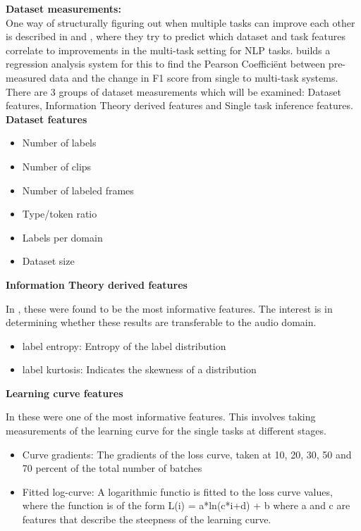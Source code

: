 	\textbf{Dataset measurements:}\\
	One way of structurally figuring out when multiple tasks can improve each other is described in \citet{alonso2016multitask} and \citet{bingel2017identifying}, where they try to predict which dataset and task features correlate to improvements in the multi-task setting for NLP tasks. \citet{bingel2017identifying} builds a regression analysis system for this to find the Pearson Coefficiënt between pre-measured data and the change in F1 score from single to multi-task systems. There are 3 groups of dataset measurements which will be examined: Dataset features, Information Theory derived features and Single task inference features. \\
	
	\textbf{Dataset features}
	\begin{itemize}
		\item Number of labels
		\item Number of clips
		\item Number of labeled frames
		\item Type/token ratio
		\item Labels per domain
		\item Dataset size
	\end{itemize}
	
	\textbf{Information Theory derived features}
	
	In \citet{alonso2016multitask}, these were found to be the most informative features. The interest is in determining whether these results are transferable to the audio domain.
	\begin{itemize}
		\item label entropy: Entropy of the label distribution
		\item label kurtosis: Indicates the skewness of a distribution
	\end{itemize}
	
	\textbf{Learning curve features}
	
	In \citet{bingel2017identifying} these were one of the most informative features. This involves taking measurements of the learning curve for the single tasks at different stages.
	\begin{itemize}
		\item Curve gradients: The gradients of the loss curve, taken at 10, 20, 30, 50 and 70 percent of the total number of batches
		\item Fitted log-curve: A logarithmic functio is fitted to the loss curve values, where the function is of the form L(i) = a*ln(c*i+d) + b where a and c are features that describe the steepness of the learning curve.
	\end{itemize}		
	
